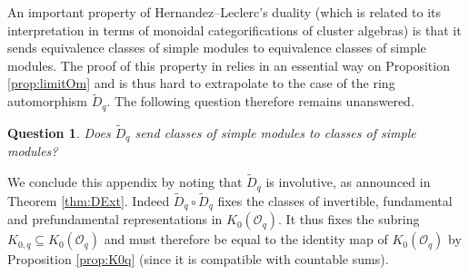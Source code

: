 \documentclass[11pt]{amsart}
\newtheorem*{question}{Question}
\theoremstyle{definition}
\theoremstyle{remark}
\numberwithin{equation}{section}
\begin{document}
An important property of Hernandez--Leclerc's duality (which is related to its interpretation in terms of monoidal categorifications of cluster algebras) is that it sends equivalence classes of simple modules to equivalence classes of simple modules. The proof of this property in \cite[Section 7B]{hl2} relies in an essential way on Proposition \ref{prop:limitOm} and is thus hard to extrapolate to the case of the ring automorphism $\tilde{D}_q$. The following question therefore remains unanswered.
\begin{question} Does $\tilde{D}_q$ send classes of simple modules to classes of simple modules?
\end{question}
We conclude this appendix by noting that $\tilde{D}_q$ is involutive, as announced in Theorem \ref{thm:DExt}. Indeed $\tilde{D}_q\circ\tilde{D}_q$ fixes the classes of invertible, fundamental and prefundamental representations in $K_0(\mathcal{O}_q)$. It thus fixes the subring $K_{0,q}\subseteq K_0(\mathcal{O}_q)$ and must therefore be equal to the identity map of $K_0(\mathcal{O}_q)$ by Proposition \ref{prop:K0q} (since it is compatible with countable sums).

\let\oldaddcontentsline\addcontentsline
\renewcommand{\addcontentsline}[3]{}
\end{document}
